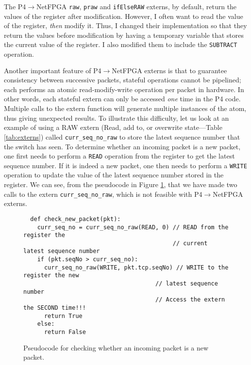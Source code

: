 The P4$\rightarrow$NetFPGA \verb|raw|, \verb|praw| and \verb|ifElseRAW| externs, by default, return the values of the register after modification. However, I often want to read the value of the register, \textit{then} modify it. Thus, I changed their implementation so that they return the values before modification by having a temporary variable that stores the current value of the register. I also modified them to include the \verb|SUBTRACT| operation.

Another important feature of P4$\rightarrow$NetFPGA externs is that to guarantee consistency between successive packets, stateful operations cannot be pipelined; each performs an atomic read-modify-write operation per packet in hardware. In other words, each stateful extern can only be accessed \textit{one} time in the P4 code. Multiple calls to the extern function will generate multiple instances of the atom, thus giving unexpected results. To illustrate this difficulty, let us look at an example of using a RAW extern (Read, add to, or overwrite state---Table \ref{tab:externs}) called \verb|curr_seq_no_raw| to store the latest sequence number that the switch has seen. To determine whether an incoming packet is a new packet, one first needs to perform a \verb|READ| operation from the register to get the latest sequence number. If it is indeed a new packet, one then needs to perform a \verb|WRITE| operation to update the value of the latest sequence number stored in the register. We can see, from the pseudocode in Figure \ref{fig:pseudo}, that we have made two calls to the extern \verb|curr_seq_no_raw|, which is not feasible with P4$\rightarrow$NetFPGA externs.

\begin{figure}[!h]
	{\renewcommand{\baselinestretch}{0.8}\small
		\begin{verbatim}
  def check_new_packet(pkt):
    curr_seq_no = curr_seq_no_raw(READ, 0) // READ from the register the 
                                           // current latest sequence number
    if (pkt.seqNo > curr_seq_no):             
      curr_seq_no_raw(WRITE, pkt.tcp.seqNo) // WRITE to the register the new 
                                      // latest sequence number
                                      // Access the extern the SECOND time!!!
      return True
    else:
      return False
		\end{verbatim}
	}
	\caption{Pseudocode for checking whether an incoming packet is a new packet.}
	\label{fig:pseudo}
\end{figure}

